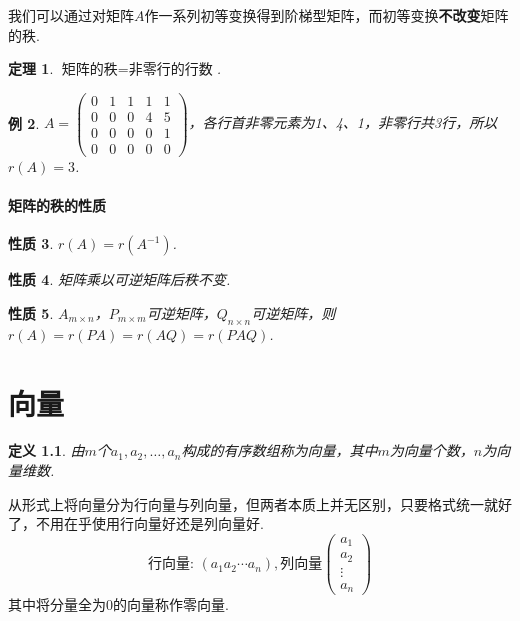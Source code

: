 \documentclass[12pt, a4paper, oneside]{ctexbook}
\newtheorem{theorem}{定理}[section]
\newtheorem{definition}[theorem]{定义}
\newtheorem{example}[theorem]{例}
\newtheorem{quolity}[theorem]{性质}
\begin{document}
我们可以通过对矩阵$A$作一系列初等变换得到阶梯型矩阵，而初等变换\textbf{不改变}矩阵的秩. 

\begin{theorem}
    $\mbox{矩阵的秩} = \mbox{非零行的行数}$. 
\end{theorem}

\begin{example}
    $A=\begin{pmatrix}
        0 & 1 & 1 & 1 & 1 \\
        0 & 0 & 0 & 4 & 5 \\
        0 & 0 & 0 & 0 & 1 \\
        0 & 0 & 0 & 0 & 0
    \end{pmatrix}$，各行首非零元素为1、4、1，非零行共3行，所以$r(A)=3$. 
\end{example}

\subsubsection{矩阵的秩的性质}

\begin{quolity}
    $r(A) = r(A^{-1})$. 
\end{quolity}

\begin{quolity}
    矩阵乘以可逆矩阵后秩不变. 
\end{quolity}

\begin{quolity}
    $A_{m \times n}$，$P_{m \times m}$可逆矩阵，$Q_{n \times n}$可逆矩阵，则$r(A) = r(PA) = r(AQ) = r(PAQ)$. 
\end{quolity}

\chapter{向量}

\begin{definition}
    由$m$个$a_1,a_2,\dots,a_n$构成的有序数组称为向量，其中$m$为向量个数，$n$为向量维数. 
\end{definition}

从形式上将向量分为行向量与列向量，但两者本质上并无区别，只要格式统一就好了，不用在乎使用行向量好还是列向量好. 
$$\mbox{行向量: }(a_1 a_2 \cdots a_n), \mbox{列向量} \begin{pmatrix}
    a_1 \\ a_2 \\ \vdots \\a_n
\end{pmatrix}$$
其中将分量全为0的向量称作零向量. 
\end{document}
